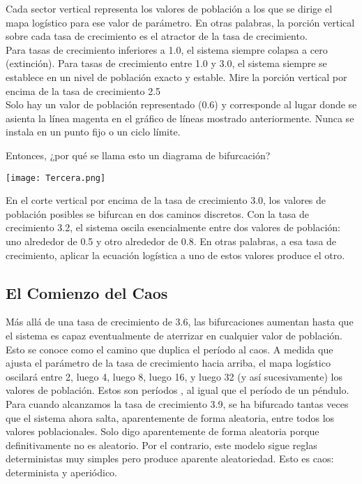 \documentclass[12pt]{article}
\begin{document}
Cada sector vertical representa los valores de población a los que se dirige el mapa logístico para ese valor de parámetro. En otras palabras, la porción vertical sobre cada tasa de crecimiento es el atractor de la tasa de crecimiento.\\

Para tasas de crecimiento inferiores a 1.0, el sistema siempre colapsa a cero (extinción). Para tasas de crecimiento entre 1.0 y 3.0, el sistema siempre se establece en un nivel de población exacto y estable. Mire la porción vertical por encima de la tasa de crecimiento 2.5\\
Solo hay un valor de población representado (0.6) y corresponde al lugar donde se asienta la línea magenta en el gráfico de líneas mostrado anteriormente. Nunca se instala en un punto fijo o un ciclo límite.

Entonces, ¿por qué se llama esto un diagrama de bifurcación?
\begin{center}
    \texttt{[image: Tercera.png]}
\end{center}

En el corte vertical por encima de la tasa de crecimiento 3.0, los valores de población posibles se bifurcan en dos caminos discretos. Con la tasa de crecimiento 3.2, el sistema oscila esencialmente entre dos valores de población: uno alrededor de 0.5 y otro alrededor de 0.8. En otras palabras, a esa tasa de crecimiento, aplicar la ecuación logística a uno de estos valores produce el otro.

\subsection*{El Comienzo del Caos}

Más allá de una tasa de crecimiento de 3.6, las bifurcaciones aumentan hasta que el sistema es capaz eventualmente de aterrizar en  cualquier valor de población. Esto se conoce como el camino que duplica el período al caos. A medida que ajusta el parámetro de la tasa de crecimiento hacia arriba, el mapa logístico oscilará entre 2, luego 4, luego 8, luego 16, y luego 32 (y así sucesivamente) los valores de población. Estos son períodos , al igual que el período de un péndulo.\\
 
 Para cuando alcanzamos la tasa de crecimiento 3.9, se ha bifurcado tantas veces que el sistema ahora salta, aparentemente de forma aleatoria, entre todos los valores poblacionales. Solo digo aparentemente de forma aleatoria porque definitivamente no es  aleatorio. Por el contrario, este modelo sigue reglas deterministas muy simples pero produce aparente aleatoriedad. Esto es caos: determinista y aperiódico.\\
\end{document}
